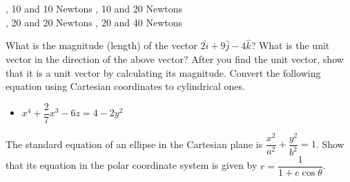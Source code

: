 \documentclass[12pt,addpoints]{exam}
\begin{document}
\begin{questions}
   		\begin{oneparchoices}
   			, 10 and 10 Newtons
   			, 10 and 20 Newtons \\
   			, 20 and 20 Newtons
   			, 20 and 40 Newtons
   		\end{oneparchoices}
   		\vspace{1in}
   		\question What is the magnitude (length) of the vector  $2\hat{i}+9\hat{j}-4\hat{k}$?\vspace{1in}
   		\question What is the unit vector in the direction of the above vector? After you find the unit vector, show that it is a unit vector by calculating its magnitude.\vspace{1in}
   		\question Convert the following equation using Cartesian coordinates to cylindrical ones.\begin{itemize}
   			\item ${x^4} + \dfrac{2}{7}{x^3} - 6z = 4 - 2{y^2}$\vspace{1.5in}
   		\end{itemize} 
   		\question The standard equation of an ellipse in the Cartesian plane is $\dfrac{x^2}{a^2}+\dfrac{y^2}{b^2}=1$. Show that its equation in the polar coordinate system is given by $r = \dfrac{1}{1+e \cos \theta}$.\vspace{2in}
   		

\end{questions}
\end{document}
